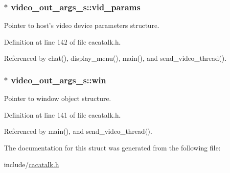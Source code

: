 \hypertarget{structvideo__out__args__s_a14fbf8a3ffd4d9534c61bff3fd6c6004}{
\subsubsection[{vid\-\_\-params}]{$\ast$ {\bf video\-\_\-out\-\_\-args\-\_\-s\-::vid\-\_\-params}}}\label{structvideo__out__args__s_a14fbf8a3ffd4d9534c61bff3fd6c6004}


\-Pointer to host's video device parameters structure. 



\-Definition at line 142 of file cacatalk.\-h.



\-Referenced by chat(), display\-\_\-menu(), main(), and send\-\_\-video\-\_\-thread().

\hypertarget{structvideo__out__args__s_a4c05a7d1e0e170c01b122e3419434b7c}{
\subsubsection[{win}]{$\ast$ {\bf video\-\_\-out\-\_\-args\-\_\-s\-::win}}}\label{structvideo__out__args__s_a4c05a7d1e0e170c01b122e3419434b7c}


\-Pointer to window object structure. 



\-Definition at line 141 of file cacatalk.\-h.



\-Referenced by main(), and send\-\_\-video\-\_\-thread().



\-The documentation for this struct was generated from the following file\-:\begin{DoxyCompactItemize}
\item 
include/\hyperlink{cacatalk_8h}{cacatalk.\-h}\end{DoxyCompactItemize}
